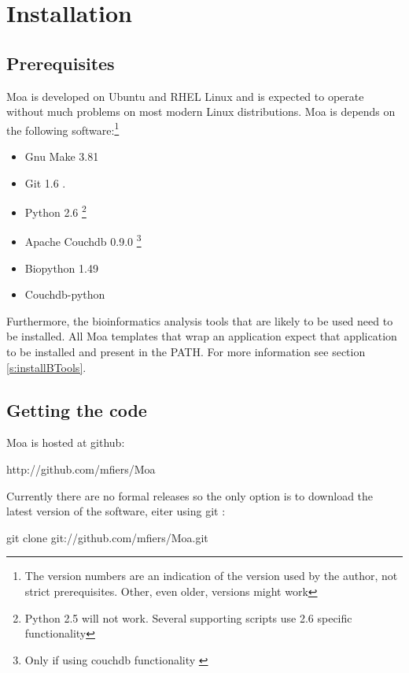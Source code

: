 \chapter{Installation}

\section{Prerequisites}

Moa is developed on Ubuntu \citep{ubuntu} and RHEL \citep{rhel} Linux
and is expected to operate without much problems on most modern Linux
distributions. Moa is depends on the following software:\footnote{The
  version numbers are an indication of the version used by the author,
  not strict prerequisites. Other, even older, versions might work}

\begin{itemize}
\item Gnu Make 3.81 \citep{Gnumake}
\item Git 1.6 \citep{git}.
\item Python 2.6 \citep{python}\footnote{Python 2.5 will not
  work. Several supporting scripts use 2.6 specific functionality}
\item Apache Couchdb 0.9.0 \citep{couchdb}\footnote{Only if using
  couchdb functionality \label{fn:usingcouchdb}}
\item Biopython 1.49 \citep{biopython}
\item Couchdb-python \citep{couchpy}
\end{itemize}

Furthermore, the bioinformatics analysis tools that are likely to be
used need to be installed. All Moa templates that wrap an application
expect that application to be installed and present in the PATH.
For more information see section \ref{s:installBTools}.

\section{Getting the code}

Moa is hosted at github:

\begin{lsturl}
http://github.com/mfiers/Moa
\end{lsturl}

Currently there are no formal releases so the only option is to
download the latest version of the software, eiter using git \citep{git}:

\begin{bash}
git clone git://github.com/mfiers/Moa.git
\end{bash}

